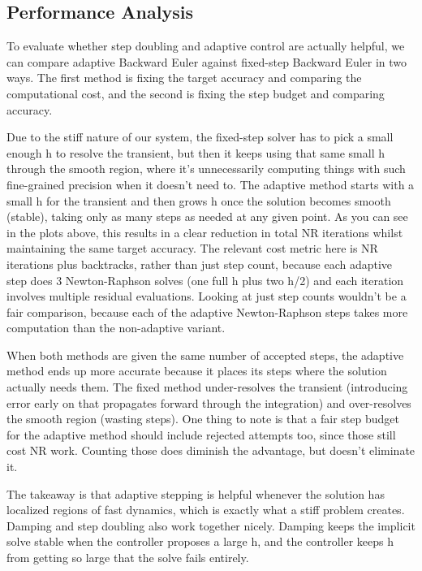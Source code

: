 \documentclass[11pt]{article}
\begin{document}
\subsection{Performance Analysis}\label{performance-analysis}

To evaluate whether step doubling and adaptive control are actually
helpful, we can compare adaptive Backward Euler against fixed-step
Backward Euler in two ways. The first method is fixing the target
accuracy and comparing the computational cost, and the second is fixing
the step budget and comparing accuracy.

Due to the stiff nature of our system, the fixed-step solver has to pick
a small enough h to resolve the transient, but then it keeps using that
same small h through the smooth region, where it's unnecessarily
computing things with such fine-grained precision when it doesn't need
to. The adaptive method starts with a small h for the transient and then
grows h once the solution becomes smooth (stable), taking only as many
steps as needed at any given point. As you can see in the plots above,
this results in a clear reduction in total NR iterations whilst
maintaining the same target accuracy. The relevant cost metric here is
NR iterations plus backtracks, rather than just step count, because each
adaptive step does 3 Newton-Raphson solves (one full h plus two h/2) and
each iteration involves multiple residual evaluations. Looking at just
step counts wouldn't be a fair comparison, because each of the adaptive
Newton-Raphson steps takes more computation than the non-adaptive
variant.

When both methods are given the same number of accepted steps, the
adaptive method ends up more accurate because it places its steps where
the solution actually needs them. The fixed method under-resolves the
transient (introducing error early on that propagates forward through
the integration) and over-resolves the smooth region (wasting steps).
One thing to note is that a fair step budget for the adaptive method
should include rejected attempts too, since those still cost NR work.
Counting those does diminish the advantage, but doesn't eliminate it.

The takeaway is that adaptive stepping is helpful whenever the solution
has localized regions of fast dynamics, which is exactly what a stiff
problem creates. Damping and step doubling also work together nicely.
Damping keeps the implicit solve stable when the controller proposes a
large h, and the controller keeps h from getting so large that the solve
fails entirely.
\end{document}
